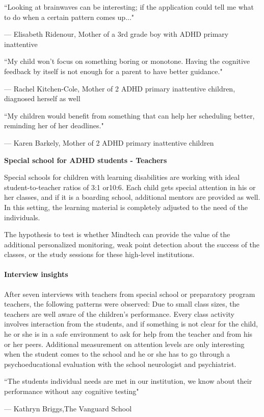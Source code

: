 \documentclass[letterpaper,10pt]{article}
\begin{document}
\textcolor{myblue}{\epigraph{``Looking at brainwaves can be interesting; if the application could tell me what to do when a certain pattern comes up..."}{--- \textup{Elisabeth Ridenour}, Mother of a 3rd grade boy with ADHD primary inattentive}}

\textcolor{myblue}{\epigraph{``My child won’t focus on something boring or monotone. Having the cognitive feedback by itself is not enough for a parent to have better guidance."}{--- \textup{Rachel Kitchen-Cole}, Mother of 2 ADHD primary inattentive children, diagnosed herself as well}}

\textcolor{myblue}{\epigraph{``My children would benefit from something that can help her scheduling better, reminding her of her deadlines."}{--- \textup{Karen Barkely}, Mother of 2 ADHD primary inattentive children}}


\textbf{Special school for ADHD students - Teachers}

Special schools for children with learning disabilities are working with ideal student-to-teacher ratios of 3:1 or10:6. Each child gets special attention in his or her classes, and if it is a boarding school, additional mentors are provided as well. In this setting, the learning material is completely adjusted to the need of the individuals.

The hypothesis to test is whether Mindtech can provide the value of the additional personalized monitoring, weak point detection about the success of the classes, or the study sessions for these high-level institutions. 

\paragraph{Interview insights}

After seven interviews with teachers from special school or preparatory program teachers, the following patterns were observed: Due to small class sizes, the teachers are well aware of the children's performance. Every class activity involves interaction from the students, and if something is not clear for the child, he or she is in a safe environment to ask for help from the teacher and from his or her peers. Additional measurement on attention levels are only interesting when the student comes to the school and he or she has to go through a psychoeducational evaluation with the school neurologist and psychiatrist. 

\textcolor{myblue}{\epigraph{``The students individual needs are met in our institution, we know about their performance without any cognitive testing"}{--- \textup{Kathryn Briggs},The Vanguard School}}
\end{document}
